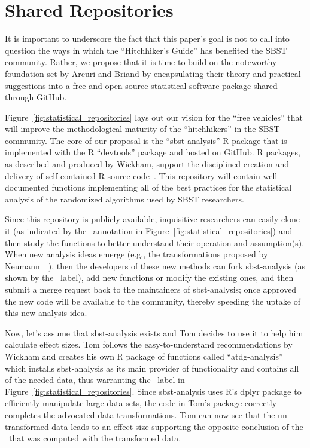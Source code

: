
\vspace*{-.5em}

\section{Shared Repositories}
\label{sec:repositories}



It is important to underscore the fact that this paper's goal is not to call into question the ways in which the
``Hitchhiker's Guide'' has benefited the SBST community. Rather, we propose that it is time to build on the noteworthy
foundation set by Arcuri and Briand by encapsulating their theory and practical suggestions into a free and open-source
statistical software package shared through GitHub.

Figure~\ref{fig:statistical_repositories} lays out our vision for the ``free vehicles'' that will improve the
methodological maturity of the ``hitchhikers'' in the SBST community. The core of our proposal is the ``sbst-analysis''
R package that is implemented with the R ``devtools'' package and hosted on GitHub. R packages, as described and
produced by Wickham, support the disciplined creation and delivery of self-contained R source
code~\cite{Wickham2015}. This repository will contain well-documented functions implementing all of the best practices
for the statistical analysis of the randomized algorithms used by SBST researchers.

Since this repository is publicly available, inquisitive researchers can easily clone it (as indicated by the
\codecopygit~annotation in Figure~\ref{fig:statistical_repositories}) and then study the functions to better understand
their operation and assumption(s). When new analysis ideas emerge (e.g., the transformations proposed by
Neumann~\etal~\cite{Neumann2015}), then the developers of these new methods can fork sbst-analysis (as shown by the
\codeforkgit~label), add new functions or modify the existing ones, and then submit a merge request back to the
maintainers of sbst-analysis; once approved the new code will be available to the community, thereby speeding the uptake
of this new analysis idea.

Now, let's assume that sbst-analysis exists and Tom decides to use it to help him calculate effect sizes. Tom follows
the easy-to-understand recommendations by Wickham and creates his own R package of functions called ``atdg-analysis''
which installs sbst-analysis as its main provider of functionality and contains all of the needed data, thus warranting
the \codedatagit~label in Figure~\ref{fig:statistical_repositories}. Since sbst-analysis uses R's dplyr package to
efficiently manipulate large data sets, the code in Tom's package correctly completes the advocated data
transformations.  Tom can now see that the un-transformed data leads to an effect size supporting the opposite
conclusion of the \atwelve~that was computed with the transformed data.

